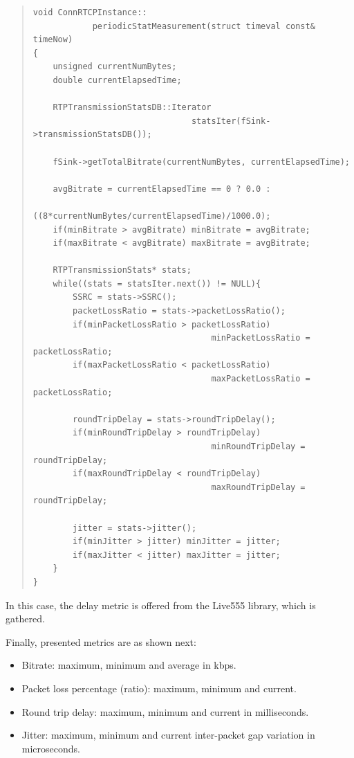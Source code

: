 \begin{quote}
\begin{verbatim}
void ConnRTCPInstance::
			periodicStatMeasurement(struct timeval const& timeNow) 
{
    unsigned currentNumBytes;
    double currentElapsedTime;

    RTPTransmissionStatsDB::Iterator 
    							statsIter(fSink->transmissionStatsDB());

    fSink->getTotalBitrate(currentNumBytes, currentElapsedTime);

    avgBitrate = currentElapsedTime == 0 ? 0.0 :
    					((8*currentNumBytes/currentElapsedTime)/1000.0);
    if(minBitrate > avgBitrate) minBitrate = avgBitrate;
    if(maxBitrate < avgBitrate) maxBitrate = avgBitrate;

    RTPTransmissionStats* stats;
    while((stats = statsIter.next()) != NULL){
        SSRC = stats->SSRC();
        packetLossRatio = stats->packetLossRatio();
        if(minPacketLossRatio > packetLossRatio) 
        							minPacketLossRatio = packetLossRatio;
        if(maxPacketLossRatio < packetLossRatio) 
        							maxPacketLossRatio = packetLossRatio;        
        
        roundTripDelay = stats->roundTripDelay();
        if(minRoundTripDelay > roundTripDelay) 
        							minRoundTripDelay = roundTripDelay;
        if(maxRoundTripDelay < roundTripDelay) 
        							maxRoundTripDelay = roundTripDelay;

        jitter = stats->jitter();
        if(minJitter > jitter) minJitter = jitter;
        if(maxJitter < jitter) maxJitter = jitter;
    }
}
\end{verbatim}
\end{quote} 

In this case, the delay metric is offered from the Live555 library, which is gathered.

Finally, presented metrics are as shown next:

\begin{itemize}
\item Bitrate: maximum, minimum and average in kbps.
\item Packet loss percentage (ratio): maximum, minimum and current.
\item Round trip delay: maximum, minimum and current in milliseconds.
\item Jitter: maximum, minimum and current inter-packet gap variation in microseconds.
\end{itemize}

